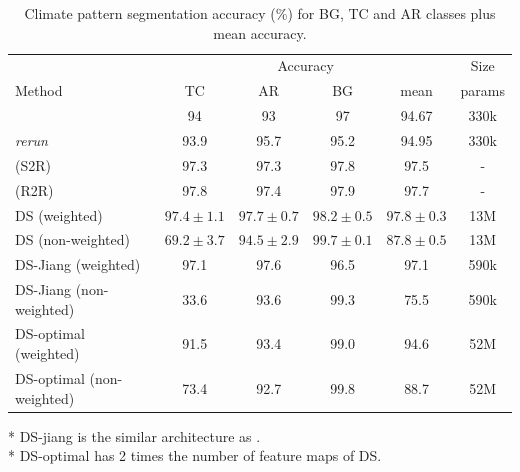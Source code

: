 \documentclass{article} %
\begin{document}
\begin{table}

\begin{tabular}{l|c c c c c}
        \multicolumn{1}{l}{} & \multicolumn{4}{c}{Accuracy} & Size\\
        \cmidrule(lr){2-5} \cmidrule(lr){6-6}
        \multicolumn{1}{l}{Method} & TC & AR & BG & mean & params \\ \hline
        \cite{jiang_spherical_2019} & 94 & 93 & 97 & 94.67 & 330k\\
        \cite{jiang_spherical_2019} \emph{rerun} & 93.9 & 95.7 & 95.2 & 94.95 & 330k\\
        \cite{cohen_gauge_2019} (S2R) & 97.3 & 97.3 & 97.8 & 97.5 & -\\
        \cite{cohen_gauge_2019} (R2R) & 97.8 & 97.4 & 97.9 & 97.7 & -\\ \hline
        DS (weighted) & $97.4\pm 1.1$ & $97.7\pm 0.7$ & $98.2\pm 0.5$ & $97.8\pm 0.3$ & 13M\\
        DS (non-weighted) & $69.2\pm 3.7$ & $94.5\pm 2.9$ & $99.7\pm 0.1$ & $87.8\pm 0.5$ & 13M\\ \hline
        DS-Jiang (weighted) & 97.1 & 97.6 & 96.5 & 97.1 & 590k\\
        DS-Jiang (non-weighted) & 33.6 & 93.6 & 99.3 & 75.5 & 590k\\ \hline
        DS-optimal (weighted) & 91.5 & 93.4 & 99.0 & 94.6 & 52M\\
        DS-optimal (non-weighted) & 73.4 & 92.7 & 99.8 & 88.7 & 52M\\ \hline
    \end{tabular}
    \caption{Climate pattern segmentation accuracy (\%) for BG, TC
and AR classes plus mean accuracy.}
\end{table}

* DS-jiang is the similar architecture as \cite{jiang_spherical_2019}.\\
* DS-optimal has 2 times the number of feature maps of DS.\\
\end{document}
